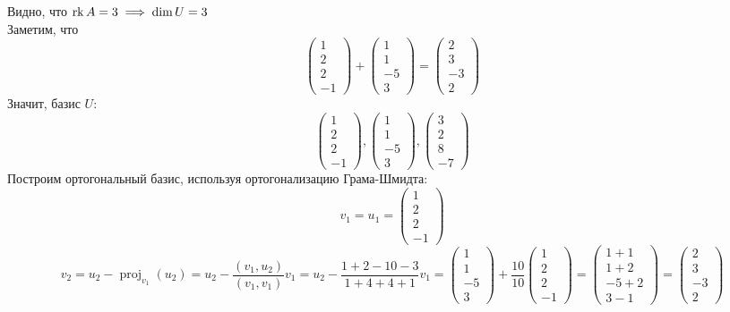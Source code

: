Видно, что $ \operatorname{rk} A = 3 \implies \dim U = 3 $ \\
Заметим, что
$$
\begin{pmatrix}
	1 \\
    2 \\
    2 \\
    -1
\end{pmatrix} +
\begin{pmatrix}
	1 \\
    1 \\
    -5 \\
    3
\end{pmatrix} =
\begin{pmatrix}
	2 \\
    3 \\
    -3 \\
    2
\end{pmatrix} $$
Значит, базис $ U $:
$$
\begin{pmatrix}
	1 \\
    2 \\
    2 \\
    -1
\end{pmatrix},
\begin{pmatrix}
	1 \\
    1 \\
    -5 \\
    3
\end{pmatrix},
\begin{pmatrix}
	3 \\
    2 \\
    8 \\
    -7
\end{pmatrix} $$
Построим ортогональный базис, используя ортогонализацию Грама-Шмидта:
$$ v_1 = u_1 =
\begin{pmatrix}
	1 \\
    2 \\
    2 \\
    -1
\end{pmatrix} $$
$$ v_2 = u_2 - \operatorname{proj}_{v_1}(u_2) = u_2 - \frac{(v_1, u_2)}{(v_1, v_1)}v_1 = u_2 - \frac{1 + 2 - 10 - 3}{1 + 4 + 4 + 1}v_1 =
\begin{pmatrix}
	1 \\
    1 \\
    -5 \\
    3
\end{pmatrix} + \frac{10}{10}
\begin{pmatrix}
	1 \\
    2 \\
    2 \\
    -1
\end{pmatrix} =
\begin{pmatrix}
	1 + 1 \\
    1 + 2 \\
    -5 + 2 \\
    3 - 1
\end{pmatrix} =
\begin{pmatrix}
	2 \\
    3 \\
    -3 \\
    2
\end{pmatrix} $$
